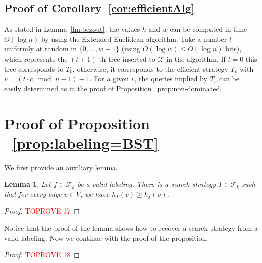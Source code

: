 \documentclass[11pt]{article}
\newtheorem{lemma}{Lemma}[section]
\newcommand{\BSTs}{\mathcal{T}}
\newcommand{\X}{\mathcal{X}}
\newcommand\+{\mkern2mu}
\newcommand{\T}{T}
\begin{document}
 \subsection{Proof of Corollary~\ref{cor:efficientAlg}}
    
    As stated in Lemma~\ref{lm:bezout}, the values $h$ and $w$ can be computed in time $O(\log n)$ by using the Extended Euclidean algorithm. Take a number $t$ uniformly at random in $\{0,\ldots,w-1\}$ (using $O(\log w)\le O(\log n)$ bits), which represents the $(t+1)$-th tree inserted to $\X$ in the algorithm. If $t=0$ this tree corresponds to $\T_0$, otherwise, it corresponds to the efficient strategy $\T_v$ with $v= (t\cdot c \mod n-1) +1$. For a given $v$, the queries implied by $\T_v$ can be easily determined as in the proof of Proposition~\ref{prop:non-dominated}.

\section{Proof of Proposition ~\ref{prop:labeling=BST}}
    We first provide an auxiliary lemma.

\begin{lemma} \label{lm:labeling<=BST}
    Let $f \in \mathcal{F}_k$ be a valid labeling. There is a search strategy $T \in \BSTs_k$ such that for every edge $v \in V$, we have $h_T(v) \geq h_f(v)$.
\end{lemma}
\begin{proof}\textcolor{red}{TOPROVE 17}\end{proof}
Notice that the proof of the lemma shows how to recover a search strategy from a valid labeling. Now we continue with the proof of the proposition.

\begin{proof}\textcolor{red}{TOPROVE 18}\end{proof}


\end{document}

